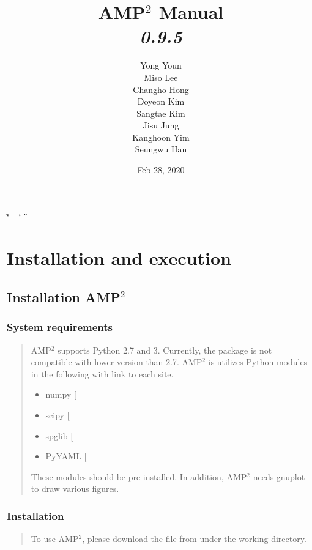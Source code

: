 \documentclass[letterpaper,10pt,english]{sphinxmanual}
\title{AMP$^\text{2}$ Manual \\ \textit{0.9.5}}
\date{Feb 28, 2020}
\author{Yong Youn \\ Miso Lee \\ Changho Hong \\ Doyeon Kim \\ Sangtae Kim \\ Jisu Jung \\ Kanghoon Yim \\ Seungwu Han}
\begin{document}
\ifdefined\shorthandoff
  \ifnum\catcode`\=\string=\active\shorthandoff{=}\fi
  \ifnum\catcode`\"=\active{}\fi
\fi

\pagestyle{empty}
\sphinxmaketitle
\pagestyle{plain}
\sphinxtableofcontents
\pagestyle{normal}
\label{\detokenize{index::doc}}



\chapter{Installation and execution}
\label{\detokenize{Installation/Installation:installation-and-execution}}\label{\detokenize{Installation/Installation::doc}}

\section{Installation AMP$^{\text{2}}$}
\label{\detokenize{Installation/Installation:installation-amp2}}

\subsection{System requirements}
\label{\detokenize{Installation/Installation:system-requirements}}\begin{quote}

AMP$^{\text{2}}$ supports Python 2.7 and 3. Currently, the package is not compatible
with lower version than 2.7. AMP$^{\text{2}}$ is utilizes Python modules
in the following with link to each site.
\begin{itemize}
\item {} 
numpy {[}\sphinxurl{https://www.numpy.org}{]}

\item {} 
scipy {[}\sphinxurl{https://www.scipy.org}{]}

\item {} 
spglib {[}\sphinxurl{https://atztogo.github.io/spglib}{]}

\item {} 
PyYAML {[}\sphinxurl{https://pypi.org/project/PyYAML}{]}

\end{itemize}

These modules should be pre-installed. In addition, AMP$^{\text{2}}$ needs gnuplot to draw
various figures.
\end{quote}


\subsection{Installation}
\label{\detokenize{Installation/Installation:installation}}\begin{quote}

To use AMP$^{\text{2}}$, please download the file from  under the
working directory.
\end{quote}
\end{document}
